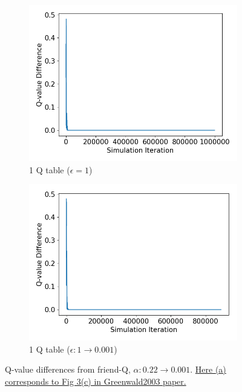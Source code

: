 \documentclass[10pt]{article}
\begin{document}
\begin{figure}[H]
\begin{subfigure}[b]{0.245\linewidth}
  \centering
  \includegraphics[width=\linewidth]{../figs/Qdifference_29_uncut.png}
      \caption{1 Q table ($\epsilon=1$)}
  \label{fig:friendQ_1Q_1}
  \end{subfigure}
    \begin{subfigure}[b]{0.245\linewidth}
  \centering
  \includegraphics[width=\linewidth]{../figs/Qdifference_28_uncut.png}
      \caption{1 Q table ($\epsilon:1\rightarrow0.001$)}
  \label{fig:friendQ_1Q_0001}
  \end{subfigure}
  \caption{Q-value differences from friend-Q, $\alpha:0.22\rightarrow0.001$. \ul{Here (a) corresponds to Fig 3(c) in Greenwald2003 paper.}\cite{GreenwaldCorrelatedQLearning2003}}
  \label{fig:friendQ}
\end{figure}
\end{document}
